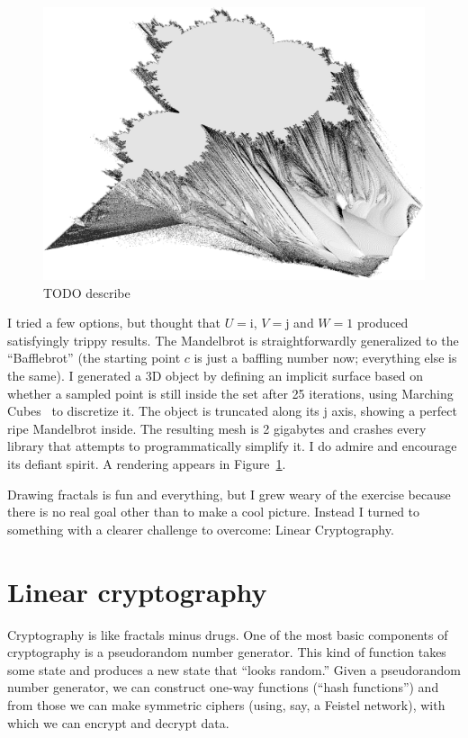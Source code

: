 \documentclass[twocolumn]{article}
\begin{document}
\begin{figure}[htp]
  \includegraphics[width=0.95 \linewidth]{bafflebrot}
  \caption{
    TODO describe
  } \label{fig:bafflebrot}
\end{figure}

I tried a few options, but thought that $U = \textrm{i}$, $V =
\textrm{j}$ and $W = 1$ produced satisfyingly trippy results. The
Mandelbrot is straightforwardly generalized to the ``Bafflebrot'' (the
starting point $c$ is just a baffling number now; everything else is
the same). I generated a 3D object by defining an implicit surface
based on whether a sampled point is still inside the set after 25
iterations, using Marching Cubes~\cite{lorensen1987marching} to
discretize it. The object is truncated along its $\textrm{j}$ axis,
showing a perfect ripe Mandelbrot inside. The resulting mesh is 2
gigabytes and crashes every library that attempts to programmatically
simplify it. I do admire and encourage its defiant spirit. A
rendering appears in Figure~\ref{fig:bafflebrot}.

\medskip
Drawing fractals is fun and everything, but I grew weary of the
exercise because there is no real goal other than to make a cool
picture. Instead I turned to something with a clearer challenge to
overcome: Linear Cryptography.

\section{Linear cryptography} \label{sec:eightbitchoppy}
Cryptography is like fractals minus drugs. One of the most basic
components of cryptography is a pseudorandom number generator. This
kind of function takes some state and produces a new state that
``looks random.'' Given a pseudorandom number generator, we can
construct one-way functions (``hash functions'') and from those we can
make symmetric ciphers (using, say, a Feistel network), with which we
can encrypt and decrypt data.
\end{document}
